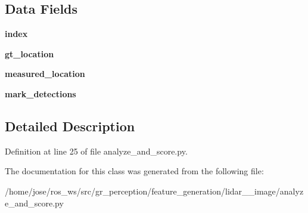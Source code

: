 \subsection*{Data Fields}
\begin{DoxyCompactItemize}
\item 
\mbox{\label{classanalyze__and__score_1_1DetectionsScore_a6426b1b7171ee098a1c3d20148b83355}} 
{\bfseries index}
\item 
\mbox{\label{classanalyze__and__score_1_1DetectionsScore_a0d989eb3facd8d7c2fd1cd00638f4fdc}} 
{\bfseries gt\+\_\+location}
\item 
\mbox{\label{classanalyze__and__score_1_1DetectionsScore_ae57c2b81a1334de11e3793d2d737c7c9}} 
{\bfseries measured\+\_\+location}
\item 
\mbox{\label{classanalyze__and__score_1_1DetectionsScore_a2f0eada2a819037ba1082a2aaa335bdb}} 
{\bfseries mark\+\_\+detections}
\end{DoxyCompactItemize}


\subsection{Detailed Description}


Definition at line 25 of file analyze\+\_\+and\+\_\+score.\+py.



The documentation for this class was generated from the following file\+:\begin{DoxyCompactItemize}
\item 
/home/jose/ros\+\_\+ws/src/gr\+\_\+perception/feature\+\_\+generation/lidar\+\_\+\_\+image/analyze\+\_\+and\+\_\+score.\+py\end{DoxyCompactItemize}
